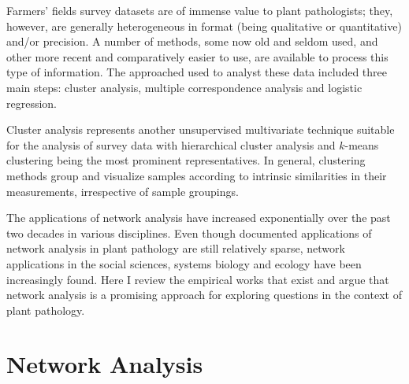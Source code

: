 \documentclass[12pt, oneside]{report}
\begin{document}
Farmers' fields survey datasets are of immense value to plant pathologists; they, however, are generally heterogeneous in format (being qualitative or quantitative) and/or precision. A number of methods, some now old and seldom used, and other more recent and comparatively easier to use, are available to process this type of information. The approached used to analyst these data included three main steps: cluster analysis, multiple correspondence analysis and logistic regression.

Cluster analysis represents another unsupervised multivariate technique suitable for the analysis of survey data with hierarchical cluster analysis and $k$-means clustering being the most prominent representatives. In general, clustering methods group and visualize samples according to intrinsic similarities in their measurements, irrespective of sample groupings. 


The applications of network analysis have increased exponentially over the past two decades in various disciplines. Even though documented applications of network analysis in plant pathology are still relatively sparse, network applications in the social sciences, systems biology and ecology have been increasingly found. Here I review the empirical works that exist and argue that network analysis is a promising approach for exploring questions in the context of plant pathology.




\section*{Network Analysis}
\end{document}
